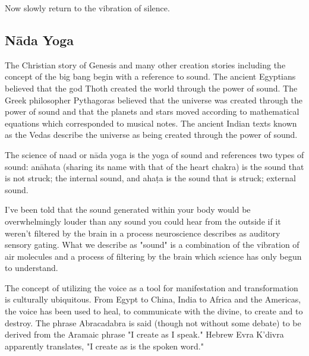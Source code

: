 \documentclass[12pt]{article}
\begin{document}
Now slowly return to the vibration of silence.

\subsection*{Nāda Yoga}

The Christian story of Genesis and many other creation stories including the concept of the big bang begin with a reference to sound. The ancient Egyptians believed that the god Thoth created the world through the power of sound. The Greek philosopher Pythagoras believed that the universe was created through the power of sound and that the planets and stars moved according to mathematical equations which corresponded to musical notes. The ancient Indian texts known as the Vedas describe the universe as being created through the power of sound.

The science of naad or nāda yoga is the yoga of sound and references two types of sound: anāhata (sharing its name with that of the heart chakra) is the sound that is not struck; the internal sound, and ahaṭa is the sound that is struck; external sound.



I've been told that the sound generated within your body would be overwhelmingly louder than any sound you could hear from the outside if it weren't filtered by the brain in a process neuroscience describes as auditory sensory gating. What we describe as "sound" is a combination of the vibration of air molecules and a process of filtering by the brain which science has only begun to understand.

The concept of utilizing the voice as a tool for manifestation and transformation is culturally ubiquitous. From Egypt to China, India to Africa and the Americas, the voice has been used to heal, to communicate with the divine, to create and to destroy. The phrase Abracadabra is said (though not without some debate) to be derived from the Aramaic phrase "I create as I speak." Hebrew Evra K'divra apparently translates, "I create as is the spoken word."
\end{document}
